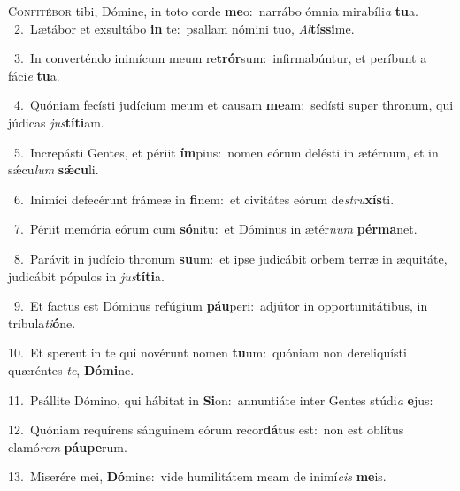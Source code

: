 \lettrine{\initial\textcolor{\initialcolor}{C}}{onfitébor} tibi, Dómine, in toto corde \textbf{me}\-o:~\star narrábo ómnia mirabíli\textit{a} \textbf{tu}\-a.\\
{\numbfont\textcolor{\numbcolor}{~2.}}~Lætábor et exsultábo \textbf{in} te:~\star psallam nómini tuo, \textit{Al}\-\textbf{tís}\textbf{si}me.\par
{\numbfont\textcolor{\numbcolor}{~3.}}~In converténdo inimícum meum re\-\textbf{trór}\-sum:~\star infirmabúntur, et períbunt a fáci\textit{e} \textbf{tu}\-a.\par
{\numbfont\textcolor{\numbcolor}{~4.}}~Quóniam fecísti judícium meum et causam \textbf{me}\-am:~\star sedísti super thronum, qui júdicas \textit{jus}\-\textbf{tí}\textbf{ti}am.\par
{\numbfont\textcolor{\numbcolor}{~5.}}~Increpásti Gentes, et périit \textbf{ím}\-pius:~\star nomen eórum delésti in ætérnum, et in sǽcu\textit{lum} \textbf{sǽ}\-\textbf{cu}li.\par
{\numbfont\textcolor{\numbcolor}{~6.}}~Inimíci defecérunt frámeæ in \textbf{fi}\-nem:~\star et civitátes eórum de\-\textit{stru}\-\textbf{xís}ti.\par
{\numbfont\textcolor{\numbcolor}{~7.}}~Périit memória eórum cum \textbf{só}\-nitu:~\star et Dóminus in ætér\textit{num} \textbf{pér}\-\textbf{ma}net.\par
{\numbfont\textcolor{\numbcolor}{~8.}}~Parávit in judício thronum \textbf{su}\-um:~\star et ipse judicábit orbem terræ in æquitáte, judicábit pópulos in \textit{jus}\-\textbf{tí}\textbf{ti}a.\par
{\numbfont\textcolor{\numbcolor}{~9.}}~Et factus est Dóminus refúgium \textbf{páu}\-peri:~\star adjútor in opportunitátibus, in tribula\-\textit{ti}\-\textbf{ó}ne.\par
{\numbfont\textcolor{\numbcolor}{10.}}~Et sperent in te qui novérunt nomen \textbf{tu}\-um:~\star quóniam non dereliquísti quæréntes \textit{te}\-, \textbf{Dó}\-\textbf{mi}ne.\par
{\numbfont\textcolor{\numbcolor}{11.}}~Psállite Dómino, qui hábitat in \textbf{Si}\-on:~\star annuntiáte inter Gentes stúdi\textit{a} \textbf{e}\-jus:\par
{\numbfont\textcolor{\numbcolor}{12.}}~Quóniam requírens sánguinem eórum recor\-\textbf{dá}\-tus est:~\star non est oblítus clamó\textit{rem} \textbf{páu}\-\textbf{pe}rum.\par
{\numbfont\textcolor{\numbcolor}{13.}}~Miserére mei, \textbf{Dó}\-mine:~\star vide humilitátem meam de inimí\textit{cis} \textbf{me}\-is.\par
